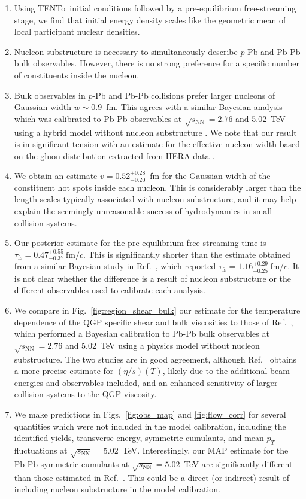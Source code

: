 \documentclass[aps,prc,reprint,amsmath,nofootinbib]{revtex4-1}
\newcommand{\trento}{T\raisebox{-0.5ex}{R}ENTo}
\newcommand{\sqrts}{\sqrt{s_\mathrm{NN}}}
\newcommand{\fmc}{\ensuremath{\text{fm}/c}}
\newcommand{\taufs}{\tau_\text{fs}}
\begin{document}
\begin{enumerate}[itemsep=0pt, leftmargin=2\parindent]
  \item
    Using \trento\ initial conditions followed by a pre-equilibrium free-streaming stage, we find that initial energy density scales like the geometric mean of local participant nuclear densities.
  \item
    Nucleon substructure is necessary to simultaneously describe $p$-Pb and Pb-Pb bulk observables. However, there is no strong preference for a specific number of constituents inside the nucleon.
  \item
    Bulk observables in $p$-Pb and Pb-Pb collisions prefer larger nucleons of Gaussian width $w \sim 0.9$~fm.
    This agrees with a similar Bayesian analysis which was calibrated to Pb-Pb observables at $\sqrts=2.76$ and 5.02~TeV using a hybrid model without nucleon substructure \cite{Bernhard:2018hnz}.
    We note that our result is in significant tension with an estimate for the effective nucleon width based on the gluon distribution extracted from HERA data \cite{Rezaeian:2012ji}.
  \item
    We obtain an estimate $v=0.52_{-0.20}^{+0.28}$~fm for the Gaussian width of the constituent hot spots inside each nucleon.
    This is considerably larger than the length scales typically associated with nucleon substructure, and it may help explain the seemingly unreasonable success of hydrodynamics in small collision systems.
  \item
    Our posterior estimate for the pre-equilibrium free-streaming time is $\taufs=0.47_{-0.37}^{+0.55}~\fmc$.
    This is significantly shorter than the estimate obtained from a similar Bayesian study in Ref.~\cite{Bernhard:2018hnz}, which reported $\taufs=1.16_{-0.25}^{+0.29}\ \fmc$.
    It is not clear whether the difference is a result of nucleon substructure or the different observables used to calibrate each analysis.
  \item
    We compare in Fig.~\ref{fig:region_shear_bulk} our estimate for the temperature dependence of the QGP specific shear and bulk viscosities to those of Ref.~\cite{Bernhard:2018hnz}, which performed a Bayesian calibration to Pb-Pb bulk observables at $\sqrts=2.76$ and 5.02~TeV using a physics model without nucleon substructure.
    The two studies are in good agreement, although Ref.~\cite{Bernhard:2018hnz} obtains a more precise estimate for $(\eta/s)(T)$, likely due to the additional beam energies and observables included, and an enhanced sensitivity of larger collision systems to the QGP viscosity.
  \item
    We make predictions in Figs.~\ref{fig:obs_map} and \ref{fig:flow_corr} for several quantities which were not included in the model calibration, including the identified yields, transverse energy, symmetric cumulants, and mean $p_T$ fluctuations at $\sqrts=5.02$~TeV.
    Interestingly, our MAP estimate for the Pb-Pb symmetric cumulants at $\sqrts=5.02$~TeV are significantly different than those estimated in Ref.~\cite{Bernhard:2018hnz}.
    This could be a direct (or indirect) result of including nucleon substructure in the model calibration.
\end{enumerate}
\end{document}

